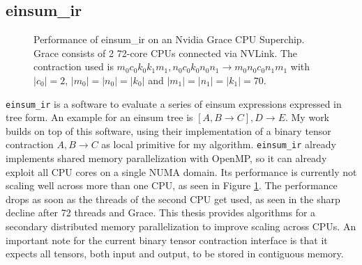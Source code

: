 \subsection{einsum\_ir}
\label{sec:einsum_ir}

\begin{figure}[ht]
  \caption{
    Performance of einsum\_ir on an Nvidia Grace CPU Superchip.
    Grace consists of 2 72-core CPUs connected via NVLink.
    The contraction used is $m_0c_0k_0k_1m_1, n_0c_0k_0n_0n_1 \rightarrow m_0n_0c_0n_1m_1$ with $|c_0|=2$, $|m_0|=|n_0|=|k_0|$ and $|m_1|=|n_1|=|k_1|=70$.
  }
  \label{fig:perf_threads}
\end{figure}

\texttt{einsum\_ir}\cite{einsum_ir} is a software to evaluate a series of einsum expressions expressed in tree form.
An example for an einsum tree is $[A,B\rightarrow C],D \rightarrow E$.
My work builds on top of this software, using their implementation of a binary tensor contraction $A,B \rightarrow C$ as local primitive for my algorithm.
\texttt{einsum\_ir} already implements shared memory parallelization with OpenMP\cite{openMP}, so it can already exploit all CPU cores on a single NUMA domain.
Its performance is currently not scaling well across more than one CPU, as seen in Figure \ref{fig:perf_threads}.
The performance drops as soon as the threads of the second CPU get used, as seen in the sharp decline after 72 threads and Grace.
This thesis provides algorithms for a secondary distributed memory parallelization to improve scaling across CPUs.
An important note for the current binary tensor contraction interface is that it expects all tensors, both input and output, to be stored in contiguous memory.
